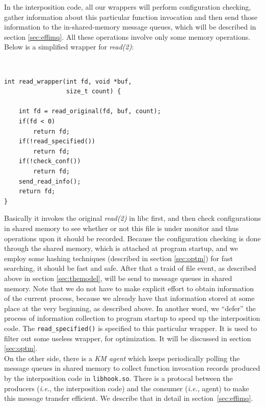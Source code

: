 \documentclass[letterpaper,twocolumn,10pt]{article}
\begin{document}
In the interposition code, all our wrappers will perform configuration
checking, gather information about this particular function invocation and
then send those information to the in-shared-memory message queues, which
will be described in section \ref{sec:effimq}. All these operations involve
only some memory operations. Below is a simplified wrapper for
\textit{read(2)}: 

{\tt \small
\begin{verbatim}
int read_wrapper(int fd, void *buf,
                 size_t count) {

    int fd = read_original(fd, buf, count);
    if(fd < 0)
        return fd;
    if(!read_specified())
        return fd;
    if(!check_conf())
        return fd;
    send_read_info();
    return fd;
}
\end{verbatim}
}

\noindent
Basically it invokes the original \textit{read(2)} in libc first, and then
check configurations in shared memory to see whether or not this file is
under monitor and thus operations upon it should be recorded. Because the
configuration checking is done through the shared memory, which is attached
at program startup, and we employ some hashing techniques (described in
section \ref{sec:optm}) for fast searching, it should be fast and safe. After
that a traid of file event, as described above in section \ref{sec:themodel},
will be send to message queues in shared memory. Note that we do not have to
make explicit effort to obtain information of the current process, because we
already have that information stored at some place at the very beginning, as
described above. In another word, we ``defer'' the process of information
collection to program startup to speed up the interposition code. The
\texttt{read\_specified()} is specified to this particular wrapper. It is
used to filter out some useless wrapper, for optimization. It will be
discussed in section \ref{sec:optm}.\\ 

On the other side, there is a \textit{KM agent} which keeps periodically
polling the message queues in shared memory to collect function invocation
records produced by the interposition code in \texttt{libhook.so}. There is a
protocal between the producers (\textit{i.e.}, the interposition code) and
the consumer (\textit{i.e.}, agent) to make this message transfer efficient.
We describe that in detail in section~\ref{sec:effimq}. 
\end{document}

